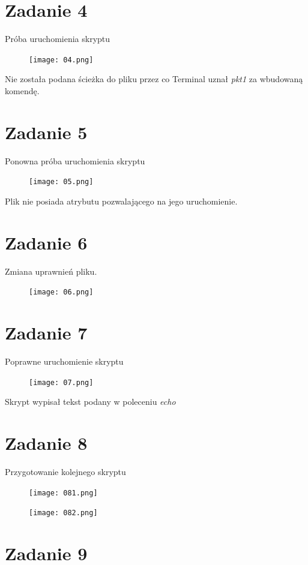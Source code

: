 \documentclass[fleqn,onecolumn,a4paper,12pt,titlepage]{article}
\begin{document}
\section*{Zadanie 4}

Próba uruchomienia skryptu
\begin{figure}[H]%
    \centering\texttt{[image: 04.png]}
\end{figure}
Nie została podana ścieżka do pliku przez co Terminal uznał \textit{pkt1} za wbudowaną komendę.

\section*{Zadanie 5}

Ponowna próba uruchomienia skryptu
\begin{figure}[H]%
    \centering\texttt{[image: 05.png]}
\end{figure}
Plik nie posiada atrybutu pozwalającego na jego uruchomienie.

\section*{Zadanie 6}

Zmiana uprawnień pliku.
\begin{figure}[H]%
    \centering\texttt{[image: 06.png]}
\end{figure}

\section*{Zadanie 7}

Poprawne uruchomienie skryptu
\begin{figure}[H]%
    \centering\texttt{[image: 07.png]}
\end{figure}
Skrypt wypisał tekst podany w poleceniu \textit{echo}

\section*{Zadanie 8}

Przygotowanie kolejnego skryptu
\begin{figure}[H]%
    \centering\texttt{[image: 081.png]}
\end{figure}
\begin{figure}[H]%
    \centering\texttt{[image: 082.png]}
\end{figure}

\section*{Zadanie 9}
\end{document}
